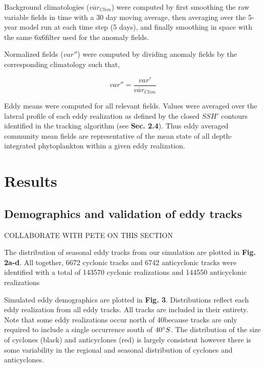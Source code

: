 \documentclass{article}
\begin{document}
Background climatologies ($\overline{var}_{Clim}$) were computed by first smoothing the raw variable fields in time with a 30 day moving average, then averaging over the 5-year model run at each time step (5 days), and finally smoothing in space with the same 6\degree x6\degree filter used for the anomaly fields. 

Normalized fields ($var''$) were computed by dividing anomaly fields by the corresponding climatology such that,

\begin{equation}
    var'' = \frac{var'}{\overline{var}_{Clim}} 
\end{equation}

Eddy means were computed for all relevant fields. Values were averaged over the lateral profile of each eddy realization as defined by the closed $SSH'$ contours identified in the tracking algorithm (see \textbf{Sec. 2.4}). Thus eddy averaged community mean fields are representative of the mean state of all depth-integrated phytoplankton within a given eddy realization. 


\section{Results}


\subsection{Demographics and validation of eddy tracks}

COLLABORATE WITH PETE ON THIS SECTION

The distribution of seasonal eddy tracks from our simulation are plotted in \textbf{Fig. 2a-d}. All together, 6672 cyclonic tracks and 6742 anticyclonic tracks were identified with a total of 143570 cyclonic realizations and 144550 anticyclonic realizations

Simulated eddy demographics are plotted in \textbf{Fig. 3}. Distributions reflect each eddy realization from all eddy tracks. All tracks are included in their entirety. Note that some eddy realizations occur north of 40\degree because tracks are only required to include a single occurrence south of $40 \degree S$. The distribution of the size of cyclones (black) and anticyclones (red) is largely consistent however there is some variability in the regional and seasonal distribution of cyclones and anticyclones.
\end{document}
